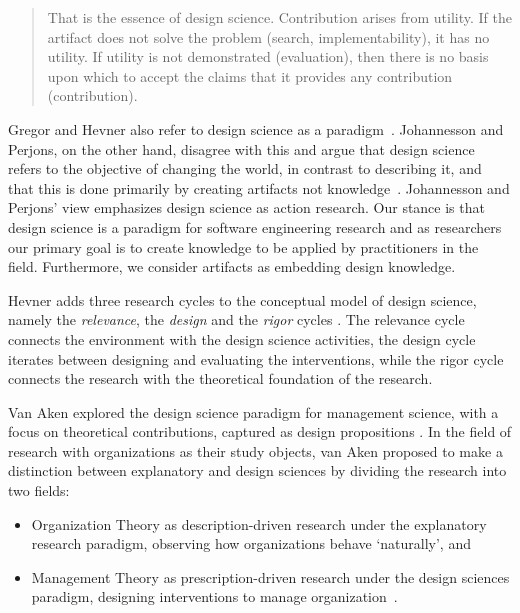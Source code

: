 \documentclass[graybox]{svmult}
\newcommand{\emelie}[1]{\textcolor{red}{{\it [Emelie says: #1]}}}
\newcommand{\emelie}[1]{}
\begin{document}
\begin{quote}
	That is the essence of design science. Contribution arises from utility. If the artifact does not solve the problem (search, implementability), it has no utility. If utility is not demonstrated (evaluation), then there is no basis upon which to accept the claims that it provides any contribution (contribution).~\cite[p. 91]{hevner_design_2004}
\end{quote}


Gregor and Hevner also refer to design science as a paradigm~\cite{gregor_positioning_2013}. Johannesson and Perjons, on the other hand, disagree with this and argue that design science refers to the objective of changing the world, in contrast to describing it, and that this is done primarily by creating artifacts not knowledge~\cite{johannesson_introduction_2014}. Johannesson and Perjons' view emphasizes design science as action research. Our stance is that design science is a paradigm for software engineering research and as researchers our primary goal is to create knowledge to be applied by practitioners in the field. Furthermore, we consider artifacts as embedding design knowledge. 

Hevner adds three research cycles to the conceptual model of design science, namely the \emph{relevance}, the \emph{design} and the \emph{rigor} cycles \cite{Hevner2007}. The relevance cycle connects the environment with the design science activities, the design  cycle iterates between designing and evaluating the interventions, while the rigor cycle connects the research with the theoretical foundation of the research.



Van Aken explored the design science paradigm for management science, with a focus on theoretical contributions, captured as design propositions \cite{van_aken_management_2004,van_aken_management_2005}. 
In the field of research with organizations as their study objects, van Aken proposed to make a distinction between explanatory and design sciences by dividing the research into two fields: 
\begin{itemize}
\item Organization Theory as description-driven research under the explanatory research paradigm, observing how organizations behave `naturally', and 
\item Management Theory as prescription-driven research under the design sciences paradigm, designing interventions to manage organization~\cite{van_aken_management_2004}.  
\end{itemize}
\end{document}
